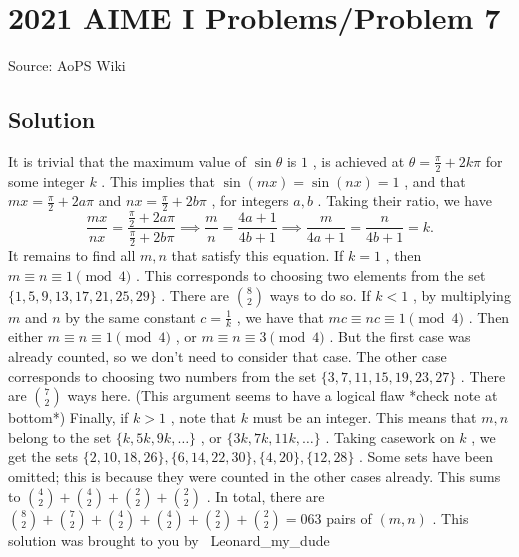 \documentclass[12pt]{article}
\begin{document}
\section*{{2021 AIME I Problems/Problem 7}}
Source: AoPS Wiki

\subsection*{Solution}
It is trivial that the maximum value of $\sin \theta$ is $1$ , is achieved at $\theta = \frac{\pi}{2}+2k\pi$ for some integer $k$ . This implies that $\sin(mx) = \sin(nx) = 1$ , and that $mx = \frac{\pi}{2}+2a\pi$ and $nx = \frac{\pi}{2}+2b\pi$ , for integers $a, b$ . Taking their ratio, we have \[\frac{mx}{nx} = \frac{\frac{\pi}{2}+2a\pi}{\frac{\pi}{2}+2b\pi} \implies \frac{m}{n} = \frac{4a + 1}{4b + 1} \implies \frac{m}{4a + 1} = \frac{n}{4b + 1} = k.\] It remains to find all $m, n$ that satisfy this equation. If $k = 1$ , then $m \equiv n \equiv 1 \pmod 4$ . This corresponds to choosing two elements from the set $\{1, 5, 9, 13, 17, 21, 25, 29\}$ . There are $\binom 82$ ways to do so. If $k < 1$ , by multiplying $m$ and $n$ by the same constant $c = \frac{1}{k}$ , we have that $mc \equiv nc \equiv 1 \pmod 4$ . Then either $m \equiv n \equiv 1 \pmod 4$ , or $m \equiv n \equiv 3 \pmod 4$ . But the first case was already counted, so we don't need to consider that case. The other case corresponds to choosing two numbers from the set $\{3, 7, 11, 15, 19, 23, 27\}$ . There are $\binom 72$ ways here. (This argument seems to have a logical flaw *check note at bottom*) Finally, if $k > 1$ , note that $k$ must be an integer. This means that $m, n$ belong to the set $\{k, 5k, 9k, \dots\}$ , or $\{3k, 7k, 11k, \dots\}$ . Taking casework on $k$ , we get the sets $\{2, 10, 18, 26\}, \{6, 14, 22, 30\}, \{4, 20\}, \{12, 28\}$ . Some sets have been omitted; this is because they were counted in the other cases already. This sums to $\binom 42 + \binom 42 + \binom 22 + \binom 22$ . In total, there are $\binom 82 + \binom 72 + \binom 42 + \binom 42 + \binom 22 + \binom 22 = \boxed{063}$ pairs of $(m, n)$ . This solution was brought to you by ~Leonard_my_dude~
\end{document}
